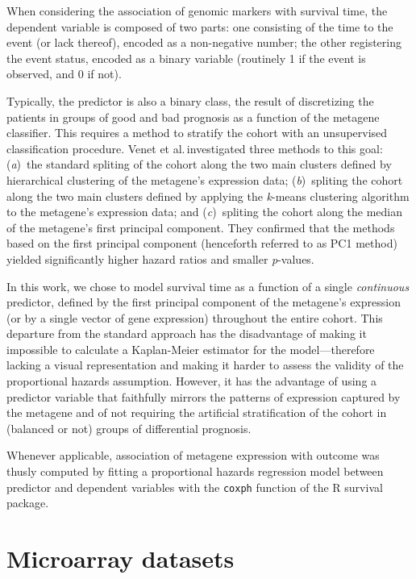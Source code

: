 When considering the association of genomic markers with survival time, the
dependent variable is composed of two parts: one consisting of the time to the
event (or lack thereof), encoded as a non-negative number; the other registering
the event status, encoded as a binary variable (routinely 1 if the event is
observed, and 0 if not).

Typically, the predictor is also a binary class, the result of discretizing the
patients in groups of good and bad prognosis as a function of the metagene
classifier.  This requires a method to stratify the cohort with an unsupervised
classification procedure.  Venet et al.\cite{venet_most_2011}\,investigated
three methods to this goal: (\emph{a})~the standard spliting of the cohort along
the two main clusters defined by hierarchical clustering of the metagene's
expression data;
(\emph{b})~spliting the cohort along the two main clusters defined
by applying the \emph{k}-means clustering algorithm to the metagene's expression
data;
and (\emph{c})~spliting the cohort along the median of the metagene's first
principal component.
They confirmed that the methods based on the first principal
component (henceforth referred to as \textsf{PC1} method) yielded significantly
higher hazard ratios and smaller \emph{p}-values.

In this work, we chose to model survival time as a function of a single
\emph{continuous} predictor, defined by the first principal component of the
metagene's expression (or by a single vector of gene expression) throughout the
entire cohort.  This departure from the standard approach has the disadvantage
of making it impossible to calculate a Kaplan-Meier estimator for the
model---therefore lacking a visual representation and making it harder to assess
the validity of the proportional hazards assumption.  However, it has the
advantage of using a predictor variable that faithfully mirrors the patterns of
expression captured by the metagene and of not requiring the artificial
stratification of the cohort in (balanced or not) groups of differential
prognosis.

Whenever applicable, association of metagene expression with outcome was thusly
computed by fitting a proportional hazards regression model between predictor
and dependent variables with the \texttt{coxph} function of the \textsf{R}
\textsf{survival} package.


\section{Microarray datasets}
\label{sec:methods-datasets}

